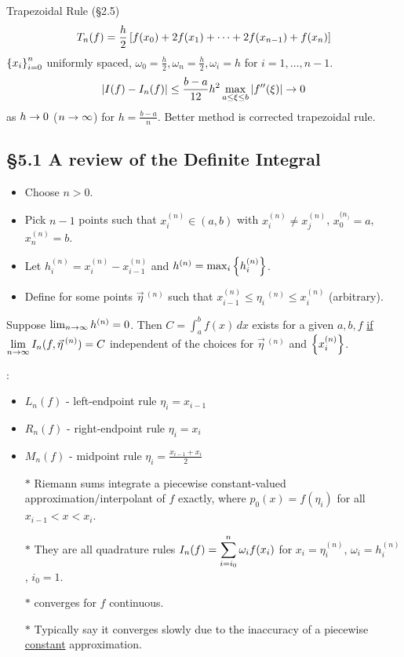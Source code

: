 \documentclass[]{article}
\begin{document}
\begin{example}
	Trapezoidal Rule (\S2.5)
	$$ T_n(f) = \frac h2 \left[ f(x_0)+2f(x_1)+\dots+2f(x_{n-1})+f(x_n) \right] $$
	$\left\{ x_i \right\}_{i=0}^n$ uniformly spaced, $\omega_0 = \frac h2,\omega_n = \frac h2, \omega_i = h$ for $i=1,\dots,n-1$.
	$$ |I(f)-I_n(f)| \leq \frac{b-a}{12}h^2 \max_{a\leq\xi\leq b}|f''(\xi)| \rightarrow 0 $$
	as $h\rightarrow 0$ ($n\rightarrow\infty$) for $h = \frac{b-a}n$. Better method is corrected trapezoidal rule.
\end{example}

\subsection*{\S5.1 A review of the Definite Integral}

\begin{itemize}
	\item Choose $n>0$.
	\item Pick $n-1$ points such that $x_i^{(n)}\in(a,b)$ with $x_i^{(n)}\neq x_j^{(n)}$, $x_0^{(n_)}=a$, $x_n^{(n)}=b$.
	\item Let $h_i^{(n)} = x_i^{(n)}-x_{i-1}^{(n)}$ and $h^{(n)}=\max_i \left\{ h_i^{(n)} \right\}$.
	\item Define  for some points $\vec\eta\,^{(n)}$ such that $x_{i-1}^{(n)} \leq \eta_i\,^{(n)} \leq x_i^{(n)}$ (arbitrary).
\end{itemize}
\begin{definition}
	Suppose $\lim_{n\rightarrow\infty} h^{(n)}=0$.
	Then $C = \int_a^b f(x)\,dx$ exists for a given $a,b,f$ \ul{if} $\displaystyle\lim_{n\rightarrow\infty} I_n(f,\vec\eta\,^{(n)}) = C$ independent of the choices for $\vec\eta\,^{(n)}$ and $\left\{ x_i^{(n)} \right\}$.
\end{definition}
\begin{example}:
	\begin{itemize}
		\item $L_n(f)$ - left-endpoint rule $\eta_i=x_{i-1}$
		\item $R_n(f)$ - right-endpoint rule $\eta_i=x_i$
		\item $M_n(f)$ - midpoint rule $\eta_i=\frac{x_{i-1}+x_i}2$
	\end{itemize}
	\begin{enumerate}
		\item[$*$] Riemann sums integrate a piecewise constant-valued approximation/interpolant of $f$ exactly, where $p_0(x) = f(\eta_i)$ for all $x_{i-1}<x<x_i$.
		\item[$*$] They are all quadrature rules $\displaystyle I_n(f) = \sum_{i=i_0}^n \omega_i f(x_i)$ for $x_i=\eta_i^{(n)}$, $\omega_i = h_i^{(n)}$, $i_0=1$.
		\item[$*$] converges for $f$ continuous.
		\item[$*$] Typically say it converges slowly due to the inaccuracy of a piecewise \ul{constant} approximation.
	\end{enumerate}
\end{example}
\end{document}

